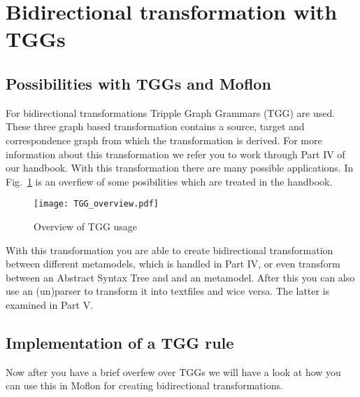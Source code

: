 \section{Bidirectional transformation with TGGs}

\subsection{Possibilities with TGGs and Moflon}
For bidirectional transformations Tripple Graph Grammars (TGG) are used. These three graph based transformation contains a source, target and correspondence graph from which the transformation is derived. For more information about this transformation we refer you to work through Part IV of our handbook.
\newline
With this transformation there are many possible applications. In Fig.~\ref{Tgg_overview} is an overfiew of some posibilities which are treated in the handbook.

\begin{figure}[htbp]
	\centering
  \texttt{[image: TGG\_overview.pdf]}
	\caption{Overview of TGG usage} 
	\label{Tgg_overview} 
\end{figure}


With this transformation you are able to create bidirectional transformation between different metamodels, which is handled in Part IV, or even transform between an Abstract Syntax Tree and and an metamodel. After this you can also use an (un)parser to transform it into textfiles and wice versa. The latter is examined in Part V.


\subsection{Implementation of a TGG rule}
Now after you have a brief overfew over TGGs we will have a look at how you can use this in Moflon for creating bidirectional transformations.

